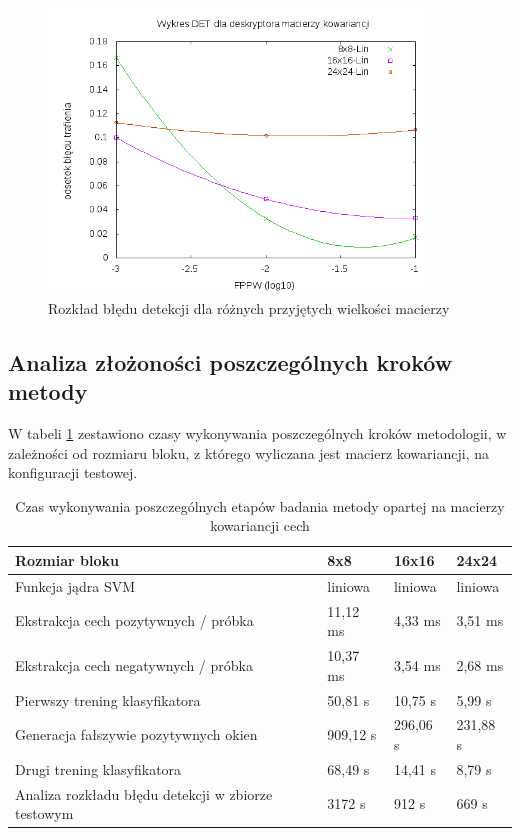 \begin{figure}[htb]
\centering
\includegraphics[width=0.9\textwidth]{cov_det.png}
\caption{Rozkład błędu detekcji dla różnych przyjętych wielkości macierzy}
\label{fig:cov_det}
\end{figure}

\subsection{Analiza złożoności poszczególnych kroków metody}

W tabeli \ref{tab:cov_times} zestawiono czasy wykonywania poszczególnych kroków metodologii, w zależności od rozmiaru bloku, z którego wyliczana jest macierz kowariancji, na konfiguracji testowej.

\begin{center}
    \begin{longtable}{ | p{5cm} | p{3cm} | p{3cm} | p{3cm} |}
    \caption{Czas wykonywania poszczególnych etapów badania metody opartej na macierzy kowariancji cech}
    \label{tab:cov_times}\\
    \hline
	Rozmiar bloku & 8x8 & 16x16 & 24x24 \\ \hline
	Funkcja jądra SVM & liniowa & liniowa & liniowa  \\ \hline
    Ekstrakcja cech pozytywnych / próbka & 11,12 ms & 4,33 ms & 3,51 ms \\ \hline
    Ekstrakcja cech negatywnych / próbka & 10,37 ms & 3,54 ms & 2,68 ms \\ \hline
    Pierwszy trening klasyfikatora & 50,81 s & 10,75 s & 5,99 s \\ \hline
    Generacja fałszywie pozytywnych okien & 909,12 s & 296,06 s & 231,88 s \\ \hline
    Drugi trening klasyfikatora & 68,49 s & 14,41 s & 8,79 s \\ \hline
    Analiza rozkładu błędu detekcji w zbiorze testowym & 3172 s & 912 s & 669 s \\ \hline
    \end{longtable}
\end{center}


